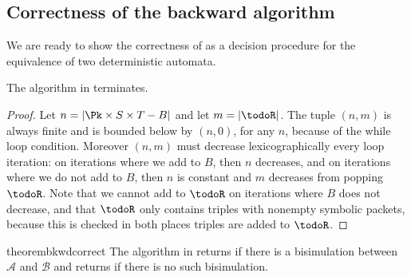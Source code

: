 \subsection{Correctness of the backward algorithm}\label{sec:bkwd-correct}

We are ready to show the correctness of  as a
decision procedure for the equivalence of two deterministic \NetKAT
automata.

\begin{lemma}\label{lem:bkwd-termination}
The algorithm in  terminates.
\end{lemma}
\begin{proof}
Let $n = |\Pk\times S\times T - B|$ and let $m = |\todoR|$.  The tuple
$(n,m)$ is always finite and is bounded below by $(n,0)$, for any $n$,
because of the while loop condition.  Moreover $(n,m)$ must decrease
lexicographically every loop iteration: on iterations where we add to
$B$, then $n$ decreases, and on iterations where we do not add to $B$,
then $n$ is constant and $m$ decreases from popping $\todoR$. Note
that we cannot add to $\todoR$ on iterations where $B$ does not
decrease, and that $\todoR$ only contains triples with nonempty
symbolic packets, because this is checked in both places triples are
added to $\todoR$.
\end{proof}

\begin{restatable}{theorem}{bkwdcorrect}\label{thm:bkwd-correct}
The algorithm in  returns \true if there is a
bisimulation between $\mathcal{A}$ and $\mathcal{B}$ and returns \false if
there is no such bisimulation.
\end{restatable}